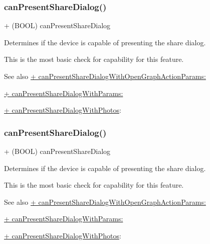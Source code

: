 \subsubsection{\texorpdfstring{can\+Present\+Share\+Dialog()}{canPresentShareDialog()}\hspace{0.1cm}{\footnotesize\ttfamily [3/5]}}
{\footnotesize\ttfamily + (B\+O\+OL) can\+Present\+Share\+Dialog \begin{DoxyParamCaption}{ }\end{DoxyParamCaption}}

Determines if the device is capable of presenting the share dialog.

This is the most basic check for capability for this feature.

\begin{DoxySeeAlso}{See also}
\hyperlink{interfaceFBDialogs_ad8921a3906d28210cad0c0871e99f4bd}{+ can\+Present\+Share\+Dialog\+With\+Open\+Graph\+Action\+Params\+:} 

\hyperlink{interfaceFBDialogs_a36e9e390bb8c6040e6027b647ed587e8}{+ can\+Present\+Share\+Dialog\+With\+Params\+:} 

\hyperlink{interfaceFBDialogs_a16156d6a4664e4ea55e351bc78b6e8a7}{+ can\+Present\+Share\+Dialog\+With\+Photos}\+: 
\end{DoxySeeAlso}
\mbox{\label{interfaceFBDialogs_a017ecb9200d66140929cce227723a4d5}} 
\subsubsection{\texorpdfstring{can\+Present\+Share\+Dialog()}{canPresentShareDialog()}\hspace{0.1cm}{\footnotesize\ttfamily [4/5]}}
{\footnotesize\ttfamily + (B\+O\+OL) can\+Present\+Share\+Dialog \begin{DoxyParamCaption}{ }\end{DoxyParamCaption}}

Determines if the device is capable of presenting the share dialog.

This is the most basic check for capability for this feature.

\begin{DoxySeeAlso}{See also}
\hyperlink{interfaceFBDialogs_ad8921a3906d28210cad0c0871e99f4bd}{+ can\+Present\+Share\+Dialog\+With\+Open\+Graph\+Action\+Params\+:} 

\hyperlink{interfaceFBDialogs_a36e9e390bb8c6040e6027b647ed587e8}{+ can\+Present\+Share\+Dialog\+With\+Params\+:} 

\hyperlink{interfaceFBDialogs_a16156d6a4664e4ea55e351bc78b6e8a7}{+ can\+Present\+Share\+Dialog\+With\+Photos}\+: 
\end{DoxySeeAlso}
\mbox{\label{interfaceFBDialogs_a017ecb9200d66140929cce227723a4d5}} 

